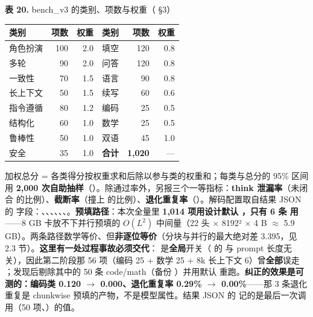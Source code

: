 \documentclass[11pt,openany]{ctexart}
\begin{document}
\noindent\textbf{表 20.} bench\allowbreak{}\_v3 的类别、项数与权重（ §3）

\begin{center}
\small
\begin{tabular}{lrrrrr}
\toprule
\textbf{类别} & \textbf{项数} & \textbf{权重} & \textbf{类别} & \textbf{项数} & \textbf{权重} \\
\midrule
角色扮演 & 100 & 2.0 & 填空 & 120 & 0.8 \\
多轮 & 90 & 2.0 & 问答 & 120 & 0.8 \\
一致性 & 70 & 1.5 & 语言 & 90 & 0.8 \\
长上下文 & 50 & 1.5 & 续写 & 60 & 0.6 \\
指令遵循 & 80 & 1.2 & 编码 & 25 & 0.5 \\
结构化 & 60 & 1.0 & 数学 & 25 & 0.5 \\
鲁棒性 & 50 & 1.0 & 双语 & 45 & 1.0 \\
安全 & 35 & 1.0 & \textbf{合计} & \textbf{1,020} & — \\
\bottomrule
\end{tabular}
\end{center}

加权总分 = 各类得分按权重求和后除以参与类的权重和；每类与总分的 95\allowbreak{}\% 区间用 \textbf{2,000 次自助抽样}（）。除通过率外，另报三个一等指标：\textbf{think 泄漏率}（未闭合  的比例）、\textbf{截断率}（撞上  的比例）、\textbf{退化重复率}（）。解码配置取自结果 JSON 的  字段：、、、、、、。\textbf{预填路径}：本次全量里 \textbf{1,014 项用设计默认 ，只有 6 条  用 }——8 GB 卡放不下并行预填的 $O(L^2)$ 中间量（22 头 $\times$ 8192² $\times$ 4 B $\approx$ 5.9 GB）。两条路径数学等价、但\textbf{非逐位等价}（分块与并行的最大绝对差 3.395，见 2.3 节）。\textbf{这里有一处过程事故必须交代}： 是\textbf{全局}开关（ 的  与 prompt 长度无关），因此第二阶段那 56 项（编码 25 + 数学 25 + 8k 长上下文 6）曾\textbf{全部}误走 ；发现后剔除其中的 50 条 code/math（备份 ）并用默认  重跑。\textbf{纠正的效果是可测的：编码类 0.120 $\rightarrow$ 0.000、退化重复率 0.29\allowbreak{}\% $\rightarrow$ 0.00\allowbreak{}\%}——那 3 条退化重复是 chunkwise 预填的产物，不是模型属性。结果 JSON 的  记的是最后一次调用（50 项、）的值。
\end{document}
